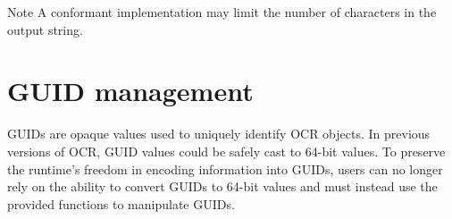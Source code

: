 \begin{DoxyNote}{Note}
A conformant implementation may limit the number of characters in the
output string.
\end{DoxyNote}
\section{GUID management}
\label{sec:OCRGuidManagement}

GUIDs are opaque values used to uniquely identify OCR objects. In
previous versions of OCR, GUID values could be safely cast to 64-bit
values. To preserve the runtime's freedom in encoding information into
GUIDs, users can no longer rely on the ability to convert GUIDs to
64-bit values and must instead use the provided functions to
manipulate GUIDs.


